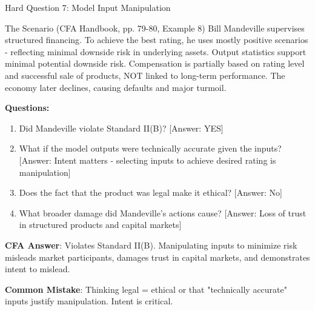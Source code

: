 \documentclass{beamer}
\begin{document}
	\begin{frame}{Hard Question 7: Model Input Manipulation}
		\begin{block}{The Scenario (CFA Handbook, pp. 79-80, Example 8)}
			Bill Mandeville supervises structured financing. To achieve the best rating, he uses mostly positive scenarios - reflecting minimal downside risk in underlying assets. Output statistics support minimal potential downside risk. Compensation is partially based on rating level and successful sale of products, NOT linked to long-term performance. The economy later declines, causing defaults and major turmoil.
		\end{block}
		
		\vspace{0.2cm}
		\textbf{Questions:}
		\begin{enumerate}
			\item Did Mandeville violate Standard II(B)? \textcolor{cfared}{[Answer: YES]}
			\item What if the model outputs were technically accurate given the inputs? \textcolor{cfared}{[Answer: Intent matters - selecting inputs to achieve desired rating is manipulation]}
			\item Does the fact that the product was legal make it ethical? \textcolor{cfared}{[Answer: No]}
			\item What broader damage did Mandeville's actions cause? \textcolor{cfared}{[Answer: Loss of trust in structured products and capital markets]}
		\end{enumerate}
		
		\vspace{0.2cm}
		\textcolor{cfablue}{\textbf{CFA Answer}}: Violates Standard II(B). Manipulating inputs to minimize risk misleads market participants, damages trust in capital markets, and demonstrates intent to mislead.
		
		\vspace{0.1cm}
		\textcolor{cfared}{\textbf{Common Mistake}}: Thinking legal = ethical or that "technically accurate" inputs justify manipulation. Intent is critical.
	\end{frame}
	
\end{document}
